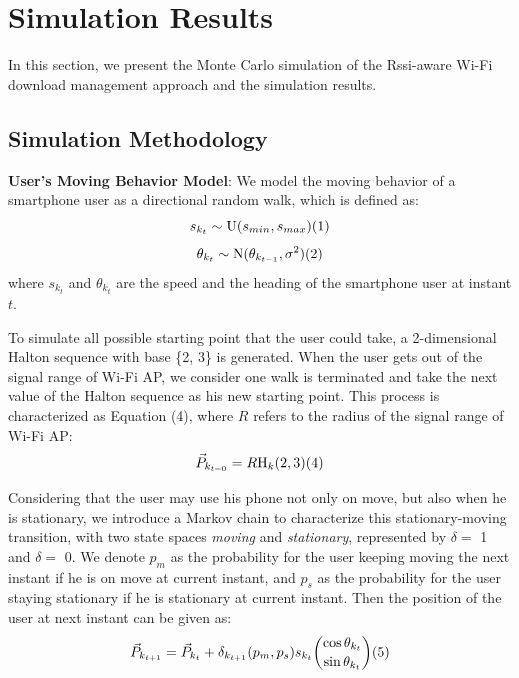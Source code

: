 \documentclass[journal]{IEEEtran}
\begin{document}
\section{Simulation Results}
In this section, we present the Monte Carlo 
simulation of the Rssi-aware Wi-Fi download
management approach and the simulation results.
\subsection{Simulation Methodology}
{\bf User's Moving Behavior Model}: 
We model the moving behavior of a smartphone user as a directional random walk, 
which is defined as:
$$ s_{k_{t}} \sim \textrm{U}(s_{min}, s_{max}) \relax(1) $$
$$ \theta_{k_{t}} \sim \textrm{N}(\theta_{k_{t-1}}, \sigma^2) \relax(2) $$
where $s_{k_{t}}$ and $\theta_{k_{t}}$ are the speed and the heading of the smartphone user at instant $t$.

To simulate all possible starting point that the user could take, 
a 2-dimensional Halton sequence \cite{biblio8} with base \{2, 3\} is generated. 
When the user gets out of the signal range of Wi-Fi AP, we consider one walk is terminated and take the next value of the Halton sequence 
as his new starting point. This process is characterized as Equation (4), where $R$ refers to the radius of the signal range of Wi-Fi AP:
\[ \vec{P}_{k_{t=0}} = R\textrm{H}_{k}(2, 3) \relax(4) \]

Considering that the user may use his phone not only on move, but also when he 
is stationary, we introduce a Markov chain to characterize this stationary-moving transition,
with two state spaces \textit{moving} and \textit{stationary}, represented by $\delta = $ 1 and  $\delta = $ 0.
We denote $p_{m}$ as the probability for the user keeping moving the next instant if he is on move at current instant, and 
$p_{s}$ as the probability for the user staying stationary if he is stationary at current instant. 
Then the position of the user
at next instant can be given as:
\[ \vec{P}_{k_{t+1}} = \vec{P}_{k_{t}} + \delta_{k_{t+1}}(p_{m}, p_{s})s_{k_{t}}{\cos\theta_{k_{t}} \choose \sin\theta_{k_{t}}} \relax(5) \]
\end{document}

